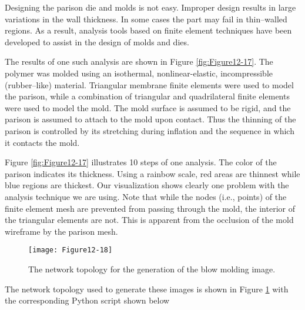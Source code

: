 Designing the parison die and molds is not easy. Improper design results in large variations in the wall thickness. In some cases the part may fail in thin--walled regions. As a result, analysis tools based on finite element techniques have been developed to assist in the design of molds and dies.

The results of one such analysis are shown in Figure \ref{fig:Figure12-17}. The polymer was molded using an isothermal, nonlinear-elastic, incompressible (rubber--like) material. Triangular membrane finite elements were used to model the parison, while a combination of triangular and quadrilateral finite elements were used to model the mold. The mold surface is assumed to be rigid, and the parison is assumed to attach to the mold upon contact. Thus the thinning of the parison is controlled by its stretching during inflation and the sequence in which it contacts the mold.

Figure \ref{fig:Figure12-17} illustrates 10 steps of one analysis. The color of the parison indicates its thickness. Using a rainbow scale, red areas are thinnest while blue regions are thickest. Our visualization shows
clearly one problem with the analysis technique we are using. Note that while the nodes (i.e., points) of the finite element mesh are prevented from passing through the mold, the interior of the triangular elements are not. This is apparent from the occlusion of the mold wireframe by the parison mesh.

\begin{figure}[!htb]
    \centering
    \texttt{[image: Figure12-18]}
    \caption{The network topology for the generation of the blow molding image.}
    \label{fig:Figure12-18}
\end{figure}

The network topology used to generate these images is shown in Figure \ref{fig:Figure12-18} with the corresponding Python script shown below

